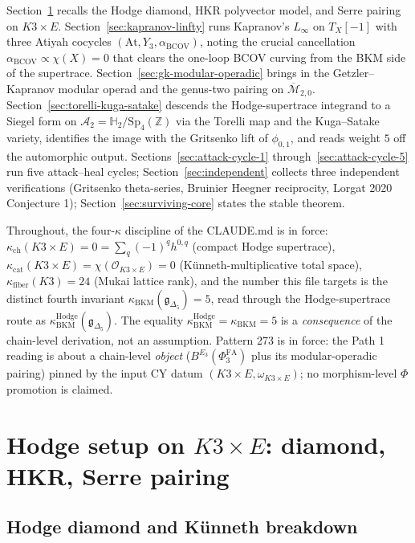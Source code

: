 \documentclass[11pt]{article}
\providecommand{\At}{\mathrm{At}}
\providecommand{\Ethree}{E_3}
\providecommand{\BCOV}{\mathrm{BCOV}}
\providecommand{\cA}{\mathcal{A}}
\providecommand{\cO}{\mathcal{O}}
\providecommand{\fg}{\mathfrak{g}}
\providecommand{\ZZ}{\mathbb{Z}}
\providecommand{\HHH}{\mathbb{H}}
\providecommand{\kBKM}{\kappa_{\mathrm{BKM}}}
\providecommand{\kch}{\kappa_{\mathrm{ch}}}
\providecommand{\kcat}{\kappa_{\mathrm{cat}}}
\providecommand{\kfib}{\kappa_{\mathrm{fiber}}}
\providecommand{\kHodge}{\kappa_{\mathrm{BKM}}^{\mathrm{Hodge}}}
\providecommand{\Mbar}{\overline{\mathcal M}}
\providecommand{\PhiFA}{\Phi^{\mathrm{FA}}}
\begin{document}
Section~\ref{sec:hodge-setup} recalls the Hodge diamond, HKR
polyvector model, and Serre pairing on $K3 \times E$.
Section~\ref{sec:kapranov-linfty} runs Kapranov's $L_\infty$ on
$T_X[-1]$ with three Atiyah cocycles $(\At, Y_3, \alpha_\BCOV)$,
noting the crucial cancellation $\alpha_\BCOV \propto \chi(X) = 0$
that clears the one-loop BCOV curving from the BKM side of the
supertrace. Section~\ref{sec:gk-modular-operadic} brings in the
Getzler--Kapranov modular operad and the genus-two pairing on
$\Mbar_{2,0}$. Section~\ref{sec:torelli-kuga-satake} descends the
Hodge-supertrace integrand to a Siegel form on $\cA_2 = \HHH_2/\mathrm{Sp}_4(\ZZ)$
via the Torelli map and the Kuga--Satake variety, identifies the
image with the Gritsenko lift of $\phi_{0,1}$, and reads weight $5$
off the automorphic output. Sections~\ref{sec:attack-cycle-1}
through~\ref{sec:attack-cycle-5} run five attack--heal cycles;
Section~\ref{sec:independent} collects three independent
verifications (Gritsenko theta-series, Bruinier Heegner reciprocity,
Lorgat 2020 Conjecture 1); Section~\ref{sec:surviving-core} states
the stable theorem.

Throughout, the four-$\kappa$ discipline of the CLAUDE.md is in force:
$\kch(K3 \times E) = 0 = \sum_q (-1)^q h^{0,q}$ (compact Hodge
supertrace), $\kcat(K3 \times E) = \chi(\cO_{K3 \times E}) = 0$
(K\"unneth-multiplicative total space), $\kfib(K3) = 24$ (Mukai
lattice rank), and the number this file targets is the distinct
fourth invariant $\kBKM(\fg_{\Delta_5}) = 5$, read through the
Hodge-supertrace route as $\kHodge(\fg_{\Delta_5})$. The equality
$\kHodge = \kBKM = 5$ is a \emph{consequence} of the chain-level
derivation, not an assumption. Pattern 273 is in force: the Path 1
reading is about a chain-level \emph{object} ($B^{\Ethree}(\PhiFA_3)$
plus its modular-operadic pairing) pinned by the input CY datum
$(K3 \times E, \omega_{K3 \times E})$; no morphism-level $\Phi$
promotion is claimed.

\section{Hodge setup on $K3 \times E$: diamond, HKR, Serre pairing}
\label{sec:hodge-setup}

\subsection{Hodge diamond and K\"unneth breakdown}
\end{document}
